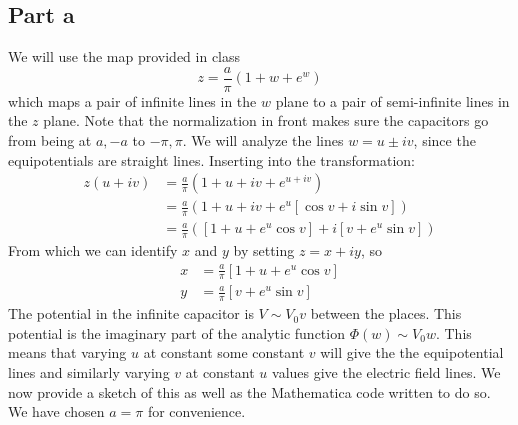 \documentclass[a4paper,12pt]{article}
\begin{document}
\subsection*{Part a}
We will use the map provided in class
\begin{equation}
z=\frac{a}{\pi}(1+w+e^w)
\end{equation}
which maps a pair of infinite lines in the $w$ plane to a pair of semi-infinite lines in the $z$ plane. Note that the normalization in front makes sure the capacitors go from being at $a,-a$ to $-\pi,\pi$. We will analyze the lines  $w=u\pm iv$, since the equipotentials are straight lines. Inserting into the transformation:
\begin{equation}
\begin{aligned}
	z(u+iv)&=\frac{a}{\pi}(1+u+iv+e^{u+iv})\\
	&=\frac{a}{\pi}(1+u+iv+e^{u}\left[\cos v+i\sin v\right])
	\\
	&=\frac{a}{\pi}(\left[1+u+e^{u}\cos v\right]+i\left[v+e^{u}\sin v\right])
\end{aligned}
\end{equation}
From which we can identify $x$ and $y$ by setting $z=x+iy$, so
\begin{equation}
\begin{aligned}
	x&=\frac{a}{\pi}\left[1+u+e^{u}\cos v\right]\\
	y&=\frac{a}{\pi}\left[v+e^{u}\sin v\right]
\end{aligned}
\end{equation}
The potential in the infinite capacitor is $V\sim V_0v$ between the places. This potential is the imaginary part of the analytic function $\Phi(w)\sim V_0 w$. This means that varying $u$ at constant some constant $v$ will give the the equipotential lines and similarly varying $v$ at constant $u$ values give the electric field lines. We now provide a sketch of this as well as the Mathematica code written to do so. We have chosen $a=\pi$ for convenience.
\end{document}

